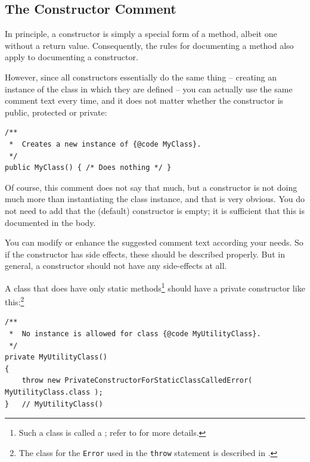 \subsection{The Constructor Comment}\label{sec:ConstructorComment}
In principle, a constructor is simply a special form of a method, albeit one without a return value. Consequently, the rules for documenting a method also apply to documenting a constructor.

However, since all constructors essentially do the same thing – creating an instance of the class in which they are defined – you can actually use the same comment text every time, and it does not matter whether the constructor is public, protected or private:
\begin{lstlisting}[caption={Simple Default Constructor}]
/**
 *  Creates a new instance of {@code MyClass}.
 */
public MyClass() { /* Does nothing */ }
\end{lstlisting}

Of course, this comment does not say that much, but a constructor is not doing much more than instantiating the class instance, and that is very obvious. You do not need to add that the (default) constructor is empty; it is sufficient that this is documented in the body. 

You can modify or enhance the suggested comment text according your needs. So if the constructor has side effects, these should be described properly. But in general, a constructor should not have any side-effects at all. 

A class that does have only static methods\footnote{Such a class is called a ; refer to  for more details.} should have a private constructor like this:\footnote{The class for the \lstinline|Error| used in the \lstinline|throw| statement is described in \autocite{TQUADRAT_ORG_FOUNDATION_PRIVATECONSTRUCTORFORSTATICCLASSCALLEDERROR}.}
\begin{lstlisting}[caption={Utility Class Constructor}]
/**
 *  No instance is allowed for class {@code MyUtilityClass}.
 */
private MyUtilityClass() 
{ 
    throw new PrivateConstructorForStaticClassCalledError( MyUtilityClass.class ); 
}   // MyUtilityClass()
\end{lstlisting}

